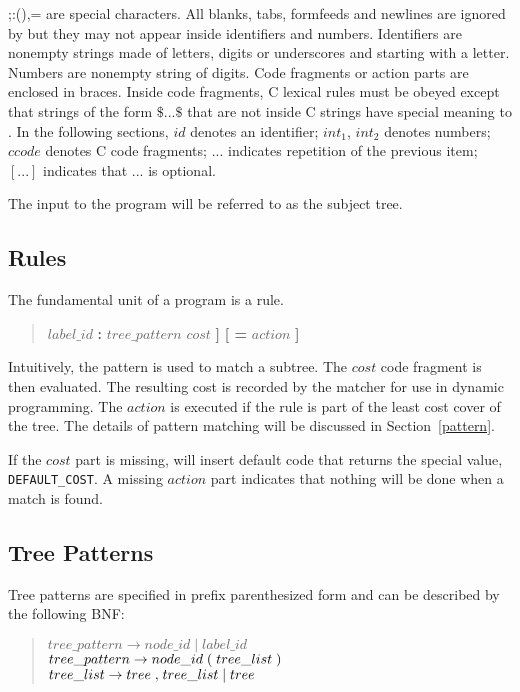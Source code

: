 \noindent ;:(),= are special characters.  All blanks, tabs, formfeeds and
newlines are ignored by \twiglang{} but they may not appear inside
identifiers and numbers.  Identifiers are nonempty strings
made of letters, digits or underscores and starting with a letter.
Numbers are nonempty string of digits.  Code fragments or action parts
are enclosed in braces.  Inside code fragments, C lexical rules must
be obeyed except that strings of the form $\$...\$$ that are not inside C
strings have special meaning to \twiglang{}.  In the following sections, $id$
denotes an identifier; $int_1$, $int_2$ denotes numbers; $ccode$
denotes C code fragments; $...$ indicates repetition of the previous
item; $[...]$ indicates that $...$ is optional.

The input to the \twiglang{} program will be referred to as the subject tree.

\subsection{Rules}

The fundamental unit of a \twiglang{} program is a rule.

\begin{verse}
$label\_id$ {\bf :} $tree\_pattern$\quad {\bf [} $cost$ {\bf ]}
{\bf [ =} $action$ {\bf ]}
\end{verse}

\noindent Intuitively, the pattern is used to match a subtree.
The $cost$ code
fragment is then evaluated.  The resulting cost is recorded by
the matcher for use in dynamic programming.  The $action$ is executed
if the rule is part of the least cost cover of the tree.
The details of pattern matching will be discussed in Section~\ref{pattern}.

If the $cost$ part is missing, \twigcomp{} will insert default code
that returns the special value, {\tt DEFAULT\_COST}.
A missing $action$ part indicates that nothing will be done when a
match is found.

\subsection{Tree Patterns}
\label{TreePatterns}
Tree patterns are specified
in prefix parenthesized form and can be described by the
following BNF:

\begin{verse}
$tree\_pattern\to node\_id\;\vert\;label\_id$\\
$tree\_pattern\to node\_id \;{\bf (}\; tree\_list \;{\bf )}$\\
$tree\_list \to tree \;{\bf ,}\; tree\_list \;\vert\; tree$\\
\end{verse}

